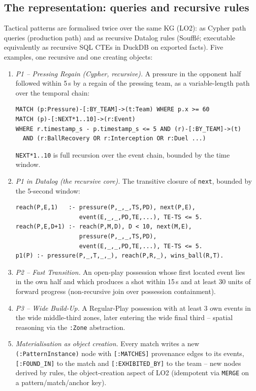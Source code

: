 \documentclass[11pt,a4paper]{article}
\begin{document}
\subsection{The representation: queries and recursive rules}

Tactical patterns are formalised twice over the same KG (LO2): as Cypher path
queries (production path) and as recursive Datalog rules (Soufflé; executable
equivalently as recursive SQL CTEs in DuckDB on exported facts). Five examples,
one recursive and one creating objects:

\begin{enumerate}[itemsep=3pt]
  \item \emph{P1 -- Pressing Regain (Cypher, recursive).} A pressure in the
    opponent half followed within 5\,s by a regain of the pressing team, as a
    variable-length path over the temporal chain:
\begin{verbatim}
MATCH (p:Pressure)-[:BY_TEAM]->(t:Team) WHERE p.x >= 60
MATCH (p)-[:NEXT*1..10]->(r:Event)
WHERE r.timestamp_s - p.timestamp_s <= 5 AND (r)-[:BY_TEAM]->(t)
  AND (r:BallRecovery OR r:Interception OR r:Duel ...)
\end{verbatim}
    \texttt{NEXT*1..10} is full recursion over the event chain, bounded by the
    time window.
  \item \emph{P1 in Datalog (the recursive core).} The transitive closure of
    \texttt{next}, bounded by the 5-second window:
\begin{verbatim}
reach(P,E,1)   :- pressure(P,_,_,TS,PD), next(P,E),
                  event(E,_,_,PD,TE,...), TE-TS <= 5.
reach(P,E,D+1) :- reach(P,M,D), D < 10, next(M,E),
                  pressure(P,_,_,TS,PD),
                  event(E,_,_,PD,TE,...), TE-TS <= 5.
p1(P) :- pressure(P,_,T,_,_), reach(P,R,_), wins_ball(R,T).
\end{verbatim}
  \item \emph{P2 -- Fast Transition.} An open-play possession whose first
    located event lies in the own half and which produces a shot within 15\,s
    and at least 30 units of forward progress (non-recursive join over
    possession containment).
  \item \emph{P3 -- Wide Build-Up.} A Regular-Play possession with at least 3
    own events in the wide middle-third zones, later entering the wide final
    third -- spatial reasoning via the \texttt{:Zone} abstraction.
  \item \emph{Materialisation as object creation.} Every match writes a new
    \texttt{(:PatternInstance)} node with \texttt{[:MATCHES]} provenance edges
    to its events, \texttt{[:FOUND\_IN]} to the match and
    \texttt{[:EXHIBITED\_BY]} to the team -- new nodes derived by rules, the
    object-creation aspect of LO2 (idempotent via \texttt{MERGE} on a
    pattern/match/anchor key).
\end{enumerate}
\end{document}
